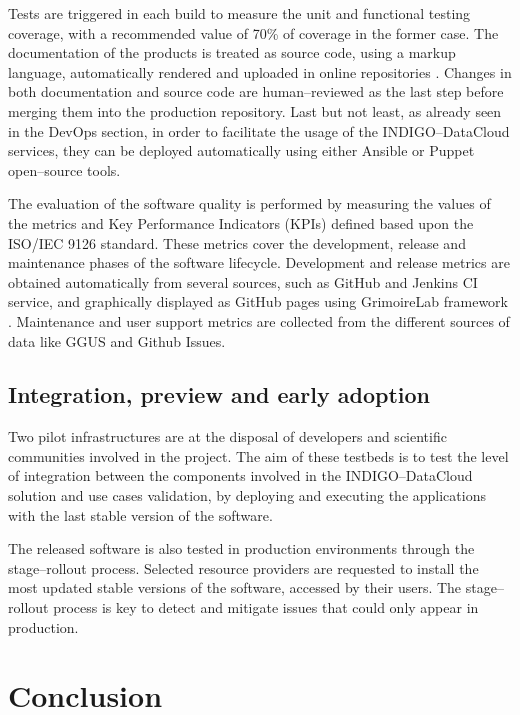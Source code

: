 \documentclass[journal]{IEEEtran}
\begin{document}
Tests are triggered in each build to measure the unit and functional testing
coverage, with a recommended value of 70\% of coverage in the former case. The
documentation of the products is treated as source code, using a markup
language, automatically rendered and uploaded in online repositories
\cite{indigo-gitbook}. Changes in both documentation and source code are
human--reviewed as the last step before merging them into the production
repository. Last but not least, as already seen in the DevOps section, in order
to facilitate the usage of the INDIGO--DataCloud services, they can be deployed
automatically using either Ansible \cite{indigo-ansible} or Puppet
\cite{indigo-puppet} open--source tools.

The evaluation of the software quality is performed by measuring the values of
the metrics and Key Performance Indicators (KPIs) defined based upon the
ISO/IEC 9126 standard. These metrics cover the development, release and
maintenance phases of the software lifecycle. Development and release metrics
are obtained automatically from several sources, such as GitHub and Jenkins CI
service, and graphically displayed as GitHub pages using GrimoireLab framework
\cite{grimoirelab}. Maintenance and user support metrics are collected from the
different sources of data like GGUS \cite{ggus} and Github Issues.

\subsection{Integration, preview and early adoption}

Two pilot infrastructures are at the disposal of developers and scientific
communities involved in the project. The aim of these testbeds is to test the
level of integration between the components involved in the INDIGO--DataCloud
solution and use cases validation, by deploying and executing the applications
with the last stable version of the software.

The released software is also tested in production environments through the
stage--rollout process. Selected resource providers are requested to install
the most updated stable versions of the software, accessed by their users. The
stage--rollout process is key to detect and mitigate issues that could only
appear in production.


\section{Conclusion}
\end{document}

